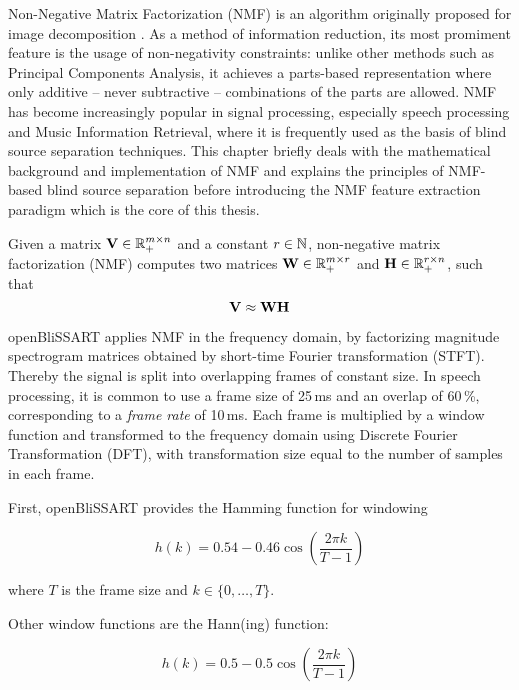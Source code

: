 Non-Negative Matrix Factorization (NMF) is an algorithm originally proposed for
image decomposition \cite{LeeSeung1999}. As a method of information reduction,
its most promiment feature is the usage of non-negativity constraints: unlike
other methods such as Principal Components Analysis, it achieves a parts-based
representation where only additive -- never subtractive -- combinations of the
parts are allowed. NMF has become increasingly popular in signal
processing, especially speech processing and Music Information Retrieval, where
it is frequently used as the basis of blind source separation techniques. This
chapter briefly deals with the mathematical background and implementation of
NMF and explains the principles of NMF-based blind source separation before
introducing the NMF feature extraction paradigm which is the core of
this thesis.


Given a matrix $\mathbf{V} \in \mathbb{R}_{+}^{m \times n}$ and a constant $r \in \mathbb{N}$,
non-negative matrix factorization (NMF) computes two matrices $\mathbf{W} \in \mathbb{R}_{+}^{m
\times r}$ and $\mathbf{H} \in \mathbb{R}_{+}^{r \times n}$, such that
\begin{equation}
    \label{math:BasicNMF}
    \mathbf{V} \approx \mathbf{WH}
\end{equation}

openBliSSART applies NMF in the frequency domain, by factorizing magnitude spectrogram matrices obtained by short-time Fourier transformation (STFT).
Thereby the signal is split into overlapping frames of constant size. In speech processing, it is common to use a frame size of 25\,ms and an overlap of 60\,\%, corresponding to a \emph{frame rate} of 10\,ms. Each frame is multiplied by a window function and transformed to the
frequency domain using Discrete Fourier Transformation (DFT), with transformation
size equal to the number of samples in each frame. 

First, openBliSSART provides the Hamming function for windowing

\begin{equation}
    h(k) = 0.54 - 0.46 \cos\left(\frac{2\pi k}{T-1} \right)
\end{equation}

\noindent where $T$ is the frame size and $k \in \{0, \dots, T\}$.

Other window functions are the Hann(ing) function:

\begin{equation}
    h(k) = 0.5 - 0.5 \cos\left(\frac{2\pi k}{T-1} \right)
\end{equation}

